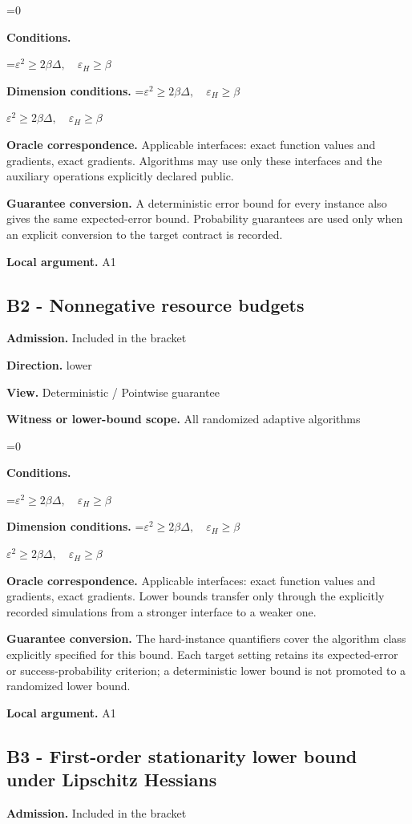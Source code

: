 \documentclass[10pt,a4paper]{article}
\newcommand{\AtlasMath}[1]{\par\begingroup\centering\setbox0=\hbox{$\displaystyle #1$}\ifdim\wd0>1.4\linewidth\typeout{ATLAS WIDE FORMULA: \the\wd0}\fi\ifdim\wd0>\linewidth\resizebox{\linewidth}{!}{\box0}\else\box0\fi\par\endgroup}
\newcommand{\AtlasInlineMath}[1]{\begingroup\setbox0=\hbox{$#1$}\ifdim\wd0>.4\linewidth\endgroup\AtlasMath{#1}\else\endgroup$#1$\fi}
\begin{document}
\AtlasMath{0}
\textbf{Conditions.} 
\AtlasMath{\varepsilon^2\ge2\beta\Delta,\quad\varepsilon_H\ge\beta}


\textbf{Dimension conditions.} \AtlasInlineMath{\varepsilon^2\ge2\beta\Delta,\quad\varepsilon_H\ge\beta}

\textbf{Oracle correspondence.} Applicable interfaces: exact function values and gradients, exact gradients. Algorithms may use only these interfaces and the auxiliary operations explicitly declared public.

\textbf{Guarantee conversion.} A deterministic error bound for every instance also gives the same expected-error bound. Probability guarantees are used only when an explicit conversion to the target contract is recorded.

\textbf{Local argument.} A1

\subsection{B2 - Nonnegative resource budgets}
\textbf{Admission.} Included in the bracket

\textbf{Direction.} lower

\textbf{View.} Deterministic / Pointwise guarantee

\textbf{Witness or lower-bound scope.} All randomized adaptive algorithms

\AtlasMath{0}
\textbf{Conditions.} 
\AtlasMath{\varepsilon^2\ge2\beta\Delta,\quad\varepsilon_H\ge\beta}


\textbf{Dimension conditions.} \AtlasInlineMath{\varepsilon^2\ge2\beta\Delta,\quad\varepsilon_H\ge\beta}

\textbf{Oracle correspondence.} Applicable interfaces: exact function values and gradients, exact gradients. Lower bounds transfer only through the explicitly recorded simulations from a stronger interface to a weaker one.

\textbf{Guarantee conversion.} The hard-instance quantifiers cover the algorithm class explicitly specified for this bound. Each target setting retains its expected-error or success-probability criterion; a deterministic lower bound is not promoted to a randomized lower bound.

\textbf{Local argument.} A1

\subsection{B3 - First-order stationarity lower bound under Lipschitz Hessians}
\textbf{Admission.} Included in the bracket
\end{document}
